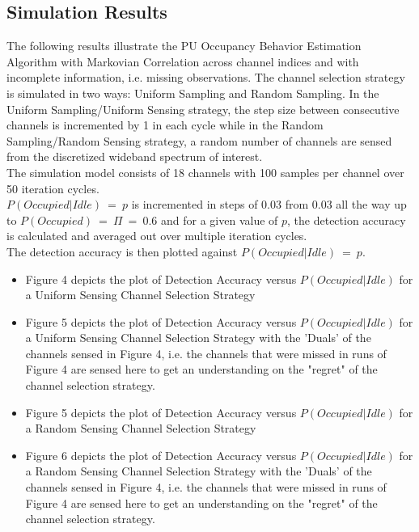 \documentclass[12pt, draftcls, onecolumn]{IEEEtran}
\begin{document}
\subsection{Simulation Results}
The following results illustrate the PU Occupancy Behavior Estimation Algorithm with Markovian Correlation across channel indices and with incomplete information, i.e. missing observations. The channel selection strategy is simulated in two ways: Uniform Sampling and Random Sampling. In the Uniform Sampling/Uniform Sensing strategy, the step size between consecutive channels is incremented by 1 in each cycle while in the Random Sampling/Random Sensing strategy, a random number of channels are sensed from the discretized wideband spectrum of interest.
\\The simulation model consists of 18 channels with 100 samples per channel over 50 iteration cycles.
\\$P(Occupied|Idle)\ =\ p$ is incremented in steps of $0.03$ from $0.03$ all the way up to $P(Occupied)\ =\ \Pi\ =\ 0.6$ and for a given value of $p$, the detection accuracy is calculated and averaged out over multiple iteration cycles.
\\The detection accuracy is then plotted against $P(Occupied|Idle)\ =\ p$.
\begin{itemize}
    \item Figure 4 depicts the plot of Detection Accuracy versus $P(Occupied|Idle)$ for a Uniform Sensing Channel Selection Strategy
    \item Figure 5 depicts the plot of Detection Accuracy versus $P(Occupied|Idle)$ for a Uniform Sensing Channel Selection Strategy with the 'Duals' of the channels sensed in Figure 4, i.e. the channels that were missed in runs of Figure 4 are sensed here to get an understanding on the "regret" of the channel selection strategy.
    \item Figure 5 depicts the plot of Detection Accuracy versus $P(Occupied|Idle)$ for a Random Sensing Channel Selection Strategy
    \item Figure 6 depicts the plot of Detection Accuracy versus $P(Occupied|Idle)$ for a Random Sensing Channel Selection Strategy with the 'Duals' of the channels sensed in Figure 4, i.e. the channels that were missed in runs of Figure 4 are sensed here to get an understanding on the "regret" of the channel selection strategy.
\end{itemize}
\end{document}

